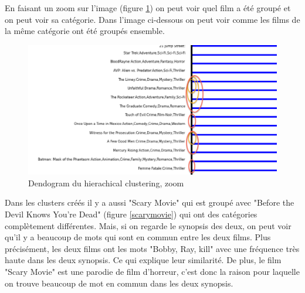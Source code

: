 En faisant un zoom sur l'image (figure \ref{zoom}) on peut voir quel film a été groupé et on peut voir sa catégorie. Dans l'image ci-dessous on peut voir comme les films de la même catégorie ont été groupés ensemble.

\begin{figure}[h]
  \centering
    \includegraphics[width=1\linewidth]{img/zoom.png}
  \caption{Dendogram du hierachical clustering, zoom}
  \label{zoom}
\end{figure}
\newpage
Dans les clusters créés il y a aussi "Scary Movie" qui est groupé avec "Before the Devil Knows You're Dead" (figure \ref{scarymovie}) qui ont des catégories complètement différentes. Mais, si on regarde le synopsis des deux, on peut voir qu’il y a beaucoup de mots qui sont en commun entre les deux films. Plus précisément, les deux films ont les mots "Bobby, Ray, kill" avec une fréquence très haute dans les deux synopsis. Ce qui explique leur similarité. De plus, le film "Scary Movie" est une parodie de film d'horreur, c'est donc la raison pour laquelle on trouve beaucoup de mot en commun dans les deux synopsis.
 
